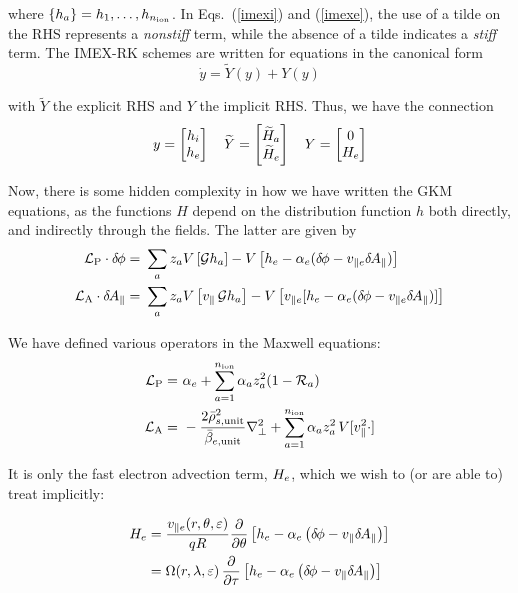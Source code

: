 where $\{h_a\} = h_1,\ldots,h_{n_{\rm ion}}$.  In 
Eqs.~(\ref{imexi}) and (\ref{imexe}), the use of a tilde
on the RHS represents a {\it nonstiff} term, while the 
absence of a tilde indicates a {\it stiff} term.
The IMEX-RK schemes are written for equations in the 
canonical form
%
\begin{equation}
{\dot y} = {\widetilde Y}(y) + Y(y)
\end{equation}

with ${\widetilde Y}$ the explicit RHS and $Y$ the implicit RHS.
Thus, we have the connection
%
\begin{equation}
y = \begin{bmatrix} h_i \\ h_e \end{bmatrix} \quad 
{\widetilde Y} = \begin{bmatrix} {\widetilde H}_a \\ {\widetilde H}_e \end{bmatrix} \quad 
Y = \begin{bmatrix} 0 \\ H_e \end{bmatrix} 
\end{equation}

Now, there is some hidden complexity in how we have written 
the GKM equations, as the functions $H$ depend on the distribution 
function $h$ both directly, and indirectly through the fields.
The latter are given by 
%
\begin{align}
 {\cal L}_{\rm P} \cdot \delta \hskip -1pt \phi = &~\sum_a z_a V\left[{\cal G} h_a \right] - 
     V \left[ h_e - \alpha_e (\delta \hskip -1pt \phi-v_{\parallel e}\delta \hskip -1pt A_\parallel) \right] \\
 {\cal L}_{\rm A} \cdot \delta \hskip -1pt A_\parallel  = &~\sum_a z_a V \left[v_\parallel \, {\cal G} h_a \right] - 
         V \left[v_{\parallel e} [h_e - \alpha_e (\delta \hskip -1pt \phi-v_{\parallel e}\delta \hskip -1pt A_\parallel)] \right]
\end{align}

We have defined various operators in the Maxwell equations:
%
\begin{align}
{\cal L}_{\rm P} = &~\alpha_e + \sum_{a=1}^{n_{\rm ion}} 
\alpha_a z_a^2 (1-{\cal R}_a) \\
{\cal L}_{\rm A} = &~-\frac{2\bar{\rho}_{s,{\rm unit}}^2}{\bar{\beta}_{e,{\rm unit}}} \nabla_\perp^2 + 
\sum_{a=1}^{n_{\rm ion}} \alpha_a z_a^2 \, V[v_\parallel^2 \cdot]
\end{align}

It is only the fast electron advection term, $H_e$, which 
we wish to (or are able to) treat implicitly:

%
\begin{align}
H_e & = \frac{v_{\parallel e}(r,\theta,{\varepsilon})}{qR} 
           \frac{\partial}{\partial\theta} \left[
             h_e - \alpha_e \left( \delta \hskip -1pt \phi - v_\parallel \delta \hskip -1pt A_\parallel \right) \right] \\
       & = \Omega(r,\lambda,{\varepsilon}) \, \frac{\partial}{\partial\tau} 
          \left[ h_e - \alpha_e \left( \delta \hskip -1pt \phi - v_\parallel \delta \hskip -1pt A_\parallel \right) \right]
\end{align}

